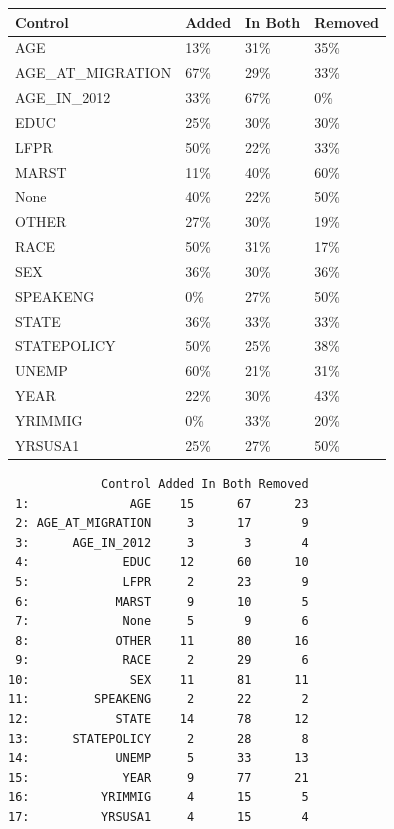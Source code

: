 \documentclass[
  letterpaper,
  DIV=11,
  numbers=noendperiod]{scrartcl}
\begin{document}
\begin{tabular}{llll}
\toprule
Control & Added & In Both & Removed\\
\midrule
AGE & 13\% & 31\% & 35\%\\
AGE\_AT\_MIGRATION & 67\% & 29\% & 33\%\\
AGE\_IN\_2012 & 33\% & 67\% & 0\%\\
EDUC & 25\% & 30\% & 30\%\\
LFPR & 50\% & 22\% & 33\%\\
\addlinespace
MARST & 11\% & 40\% & 60\%\\
None & 40\% & 22\% & 50\%\\
OTHER & 27\% & 30\% & 19\%\\
RACE & 50\% & 31\% & 17\%\\
SEX & 36\% & 30\% & 36\%\\
\addlinespace
SPEAKENG & 0\% & 27\% & 50\%\\
STATE & 36\% & 33\% & 33\%\\
STATEPOLICY & 50\% & 25\% & 38\%\\
UNEMP & 60\% & 21\% & 31\%\\
YEAR & 22\% & 30\% & 43\%\\
\addlinespace
YRIMMIG & 0\% & 33\% & 20\%\\
YRSUSA1 & 25\% & 27\% & 50\%\\
\bottomrule
\end{tabular}

\begin{verbatim}
             Control Added In Both Removed
 1:              AGE    15      67      23
 2: AGE_AT_MIGRATION     3      17       9
 3:      AGE_IN_2012     3       3       4
 4:             EDUC    12      60      10
 5:             LFPR     2      23       9
 6:            MARST     9      10       5
 7:             None     5       9       6
 8:            OTHER    11      80      16
 9:             RACE     2      29       6
10:              SEX    11      81      11
11:         SPEAKENG     2      22       2
12:            STATE    14      78      12
13:      STATEPOLICY     2      28       8
14:            UNEMP     5      33      13
15:             YEAR     9      77      21
16:          YRIMMIG     4      15       5
17:          YRSUSA1     4      15       4
\end{verbatim}
\end{document}
